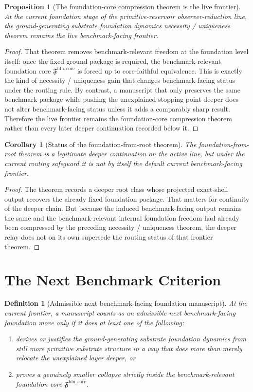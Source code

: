 \documentclass[11pt]{article}
\newcommand{\FoundationCore}{\mathfrak F^{\mathrm{fdn,core}}}
\newtheorem{definition}{Definition}
\newtheorem{proposition}{Proposition}
\newtheorem{corollary}{Corollary}
\begin{document}
\begin{proposition}[The foundation-core compression theorem is the live frontier]
At the current foundation stage of the primitive-reservoir observer-reduction line, the ground-generating substrate foundation dynamics necessity / uniqueness theorem remains the live benchmark-facing frontier.
\end{proposition}

\begin{proof}
That theorem removes benchmark-relevant freedom at the foundation level itself: once the fixed ground package is required, the benchmark-relevant foundation core \(\FoundationCore\) is forced up to core-faithful equivalence. This is exactly the kind of necessity / uniqueness gain that changes benchmark-facing status under the routing rule. By contrast, a manuscript that only preserves the same benchmark package while pushing the unexplained stopping point deeper does not alter benchmark-facing status unless it adds a comparably sharp result. Therefore the live frontier remains the foundation-core compression theorem rather than every later deeper continuation recorded below it.
\end{proof}

\begin{corollary}[Status of the foundation-from-root theorem]
The foundation-from-root theorem is a legitimate deeper continuation on the active line, but under the current routing safeguard it is not by itself the default current benchmark-facing frontier.
\end{corollary}

\begin{proof}
The theorem records a deeper root class whose projected exact-shell output recovers the already fixed foundation package. That matters for continuity of the deeper chain. But because the induced benchmark-facing output remains the same and the benchmark-relevant internal foundation freedom had already been compressed by the preceding necessity / uniqueness theorem, the deeper relay does not on its own supersede the routing status of that frontier theorem.
\end{proof}

\section{The Next Benchmark Criterion}

\begin{definition}[Admissible next benchmark-facing foundation manuscript]
At the current frontier, a manuscript counts as an admissible next benchmark-facing foundation move only if it does at least one of the following:
\begin{enumerate}
    \item derives or justifies the ground-generating substrate foundation dynamics from still more primitive substrate structure in a way that does more than merely relocate the unexplained layer deeper, or
    \item proves a genuinely smaller collapse strictly inside the benchmark-relevant foundation core \(\FoundationCore\).
\end{enumerate}
\end{definition}
\end{document}
